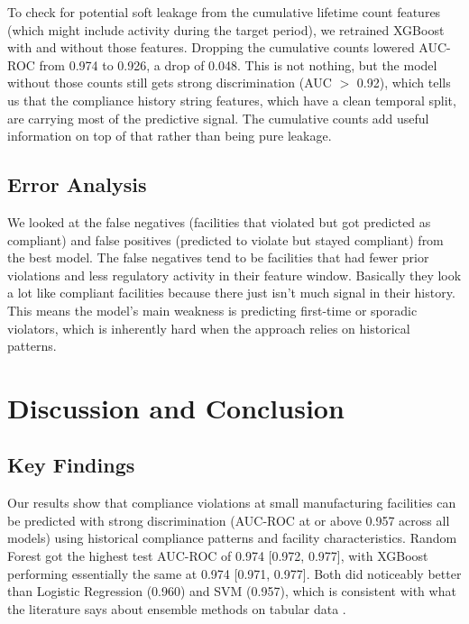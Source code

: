 \documentclass[11pt]{article}
\begin{document}
To check for potential soft leakage from the cumulative lifetime count features (which might include activity during the target period), we retrained XGBoost with and without those features. Dropping the cumulative counts lowered AUC-ROC from 0.974 to 0.926, a drop of 0.048. This is not nothing, but the model without those counts still gets strong discrimination (AUC $>$ 0.92), which tells us that the compliance history string features, which have a clean temporal split, are carrying most of the predictive signal. The cumulative counts add useful information on top of that rather than being pure leakage.

\subsection{Error Analysis}

We looked at the false negatives (facilities that violated but got predicted as compliant) and false positives (predicted to violate but stayed compliant) from the best model. The false negatives tend to be facilities that had fewer prior violations and less regulatory activity in their feature window. Basically they look a lot like compliant facilities because there just isn't much signal in their history. This means the model's main weakness is predicting first-time or sporadic violators, which is inherently hard when the approach relies on historical patterns.


\section{Discussion and Conclusion}

\subsection{Key Findings}

Our results show that compliance violations at small manufacturing facilities can be predicted with strong discrimination (AUC-ROC at or above 0.957 across all models) using historical compliance patterns and facility characteristics. Random Forest got the highest test AUC-ROC of 0.974 [0.972, 0.977], with XGBoost performing essentially the same at 0.974 [0.971, 0.977]. Both did noticeably better than Logistic Regression (0.960) and SVM (0.957), which is consistent with what the literature says about ensemble methods on tabular data \cite{chen2016}.
\end{document}
